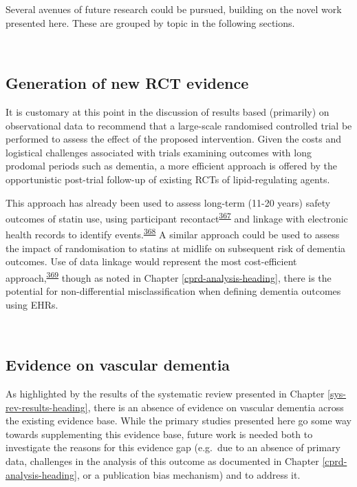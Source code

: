 \documentclass[a4paper, twoside]{templates/ociamthesis}
\begin{document}
Several avenues of future research could be pursued, building on the novel work presented here. These are grouped by topic in the following sections.

~

\hypertarget{generation-of-new-rct-evidence}{%
\subsection{Generation of new RCT evidence}\label{generation-of-new-rct-evidence}}

It is customary at this point in the discussion of results based (primarily) on observational data to recommend that a large-scale randomised controlled trial be performed to assess the effect of the proposed intervention. Given the costs and logistical challenges associated with trials examining outcomes with long prodomal periods such as dementia, a more efficient approach is offered by the opportunistic post-trial follow-up of existing RCTs of lipid-regulating agents.

This approach has already been used to assess long-term (11-20 years) safety outcomes of statin use, using participant recontact\textsuperscript{\protect\hyperlink{ref-group2011}{367}} and linkage with electronic health records to identify events.\textsuperscript{\protect\hyperlink{ref-ford2016}{368}} A similar approach could be used to assess the impact of randomisation to statins at midlife on subsequent risk of dementia outcomes. Use of data linkage would represent the most cost-efficient approach,\textsuperscript{\protect\hyperlink{ref-llewellyn-bennett2018}{369}} though as noted in Chapter \ref{cprd-analysis-heading}, there is the potential for non-differential misclassification when defining dementia outcomes using EHRs.

~

\hypertarget{evidence-on-vascular-dementia}{%
\subsection{Evidence on vascular dementia}\label{evidence-on-vascular-dementia}}

As highlighted by the results of the systematic review presented in Chapter \ref{sys-rev-results-heading}, there is an absence of evidence on vascular dementia across the existing evidence base. While the primary studies presented here go some way towards supplementing this evidence base, future work is needed both to investigate the reasons for this evidence gap (e.g.~due to an absence of primary data, challenges in the analysis of this outcome as documented in Chapter \ref{cprd-analysis-heading}, or a publication bias mechanism) and to address it.
\end{document}
